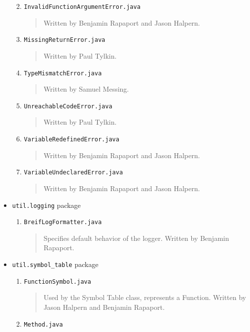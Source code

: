 \documentclass{report}
\begin{document}
\begin{itemize}
\begin{enumerate}
\begin{quotation}
\end{quotation}
\item \texttt{InvalidFunctionArgumentError.java}
\begin{quotation}
\noindent Written by Benjamin Rapaport and Jason Halpern. 
\end{quotation}
\item \texttt{MissingReturnError.java}
\begin{quotation}
\noindent Written by Paul Tylkin. 
\end{quotation}
\item \texttt{TypeMismatchError.java}
\begin{quotation}
\noindent Written by Samuel Messing. 
\end{quotation}
\item \texttt{UnreachableCodeError.java}
\begin{quotation}
\noindent Written by Paul Tylkin. 
\end{quotation}
\item \texttt{VariableRedefinedError.java}
\begin{quotation}
\noindent Written by Benjamin Rapaport and Jason Halpern. 
\end{quotation}
\item \texttt{VariableUndeclaredError.java}
\begin{quotation}
\noindent Written by Benjamin Rapaport and Jason Halpern. 
\end{quotation}
\end{enumerate} %
\item \texttt{util.logging} package
\begin{enumerate}
\item \texttt{BreifLogFormatter.java}
\begin{quotation}
\noindent Specifies default behavior of the logger. Written by Benjamin Rapaport. 
\end{quotation}
\end{enumerate} %
\item \texttt{util.symbol\_table} package
\begin{enumerate}
\item \texttt{FunctionSymbol.java}
\begin{quotation}
\noindent Used by the Symbol Table class, represents a Function. Written by Jason Halpern and Benjamin Rapaport. 
\end{quotation}
\item \texttt{Method.java}
\begin{quotation}

\end{quotation}
\end{enumerate}
\end{itemize}
\end{document}

